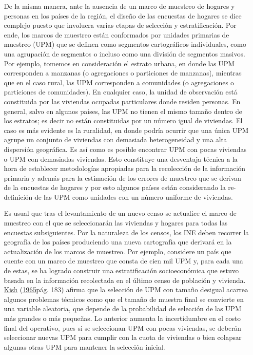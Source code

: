 \documentclass[
  12pt,
  spanish,
]{book}
\begin{document}
De la misma manera, ante la ausencia de un marco de muestreo de hogares y personas en los países de la región, el diseño de las encuestas de hogares se dice complejo puesto que involucra varias etapas de selección y estratificación. Por ende, los marcos de muestreo están conformados por unidades primarias de muestreo (UPM) que se definen como segmentos cartográficos individuales, como una agrupación de segmentos o incluso como una división de segmentos masivos. Por ejemplo, tomemos en consideración el estrato urbana, en donde las UPM corresponden a manzanas (o agregaciones o particiones de manzanas), mientras que en el caso rural, las UPM corresponden a comunidades (o agregaciones o particiones de comunidades). En cualquier caso, la unidad de observación está constituida por las viviendas ocupadas particulares donde residen personas. En general, salvo en algunos países, las UPM no tienen el mismo tamaño dentro de los estratos; es decir no están constituidas por un número igual de viviendas. El caso es más evidente es la ruralidad, en donde podría ocurrir que una única UPM agrupe un conjunto de viviendas con demasiada heterogeneidad y una alta dispersión geográfica. Es así como es posible encontrar UPM con pocas viviendas o UPM con demasiadas viviendas. Esto constituye una desventaja técnica a la hora de establecer metodologías apropiadas para la recolección de la información primaria y además para la estimación de los errores de muestreo que se derivan de la encuestas de hogares y por esto algunos países están considerando la re-definición de las UPM como unidades con un número uniforme de viviendas.

Es usual que tras el levantamiento de un nuevo censo se actualice el marco de muestreo con el que se seleccionarán las viviendas y hogares para todas las encuestas subsiguientes. Por la naturaleza de los censos, los INE deben recorrer la geografía de los países produciendo una nueva cartografía que derivará en la actualización de los marcos de muestreo. Por ejemplo, considere un país que cuente con un marco de muestreo que consta de cien mil UPM y, para cada una de estas, se ha logrado construir una estratificación socioeconómica que estuvo basada en la información recolectada en el último censo de población y vivienda. \protect\hyperlink{ref-Kish_1965}{Kish} (\protect\hyperlink{ref-Kish_1965}{1965}pág. 183) afirma que la selección de UPM con tamaño desigual acarrea algunos problemas técnicos como que el tamaño de muestra final se convierte en una variable aleatoria, que depende de la probabilidad de selección de las UPM más grandes o más pequeñas. Lo anterior aumenta la incertidumbre en el costo final del operativo, pues si se seleccionan UPM con pocas viviendas, se deberán seleccionar nuevas UPM para cumplir con la cuota de viviendas o bien colapsar algunas otras UPM para mantener la selección inicial.
\end{document}
